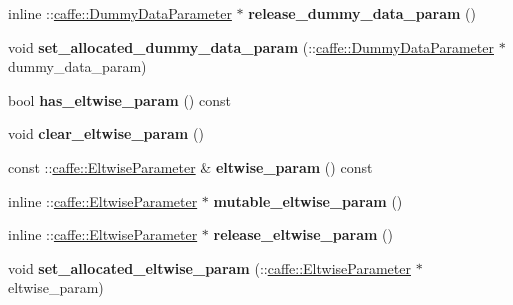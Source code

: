 \begin{DoxyCompactItemize}
inline \+::\mbox{\hyperlink{classcaffe_1_1_dummy_data_parameter}{caffe\+::\+Dummy\+Data\+Parameter}} $\ast$ {\bfseries release\+\_\+dummy\+\_\+data\+\_\+param} ()
\item 
\mbox{\label{classcaffe_1_1_v1_layer_parameter_a1463d1aa1e588be8feabd0cf71f1212c}} 
void {\bfseries set\+\_\+allocated\+\_\+dummy\+\_\+data\+\_\+param} (\+::\mbox{\hyperlink{classcaffe_1_1_dummy_data_parameter}{caffe\+::\+Dummy\+Data\+Parameter}} $\ast$dummy\+\_\+data\+\_\+param)
\item 
\mbox{\label{classcaffe_1_1_v1_layer_parameter_a5cf2168effced6bf934b951619b4e41a}} 
bool {\bfseries has\+\_\+eltwise\+\_\+param} () const
\item 
\mbox{\label{classcaffe_1_1_v1_layer_parameter_ac14bdfc8574470b615308f6526d93e64}} 
void {\bfseries clear\+\_\+eltwise\+\_\+param} ()
\item 
\mbox{\label{classcaffe_1_1_v1_layer_parameter_ae1346711b385926968253890384d7578}} 
const \+::\mbox{\hyperlink{classcaffe_1_1_eltwise_parameter}{caffe\+::\+Eltwise\+Parameter}} \& {\bfseries eltwise\+\_\+param} () const
\item 
\mbox{\label{classcaffe_1_1_v1_layer_parameter_a9e10f431a303b0c5cda37ee59fca45a6}} 
inline \+::\mbox{\hyperlink{classcaffe_1_1_eltwise_parameter}{caffe\+::\+Eltwise\+Parameter}} $\ast$ {\bfseries mutable\+\_\+eltwise\+\_\+param} ()
\item 
\mbox{\label{classcaffe_1_1_v1_layer_parameter_a5688cd87c27c83abf71cd968b2708ed7}} 
inline \+::\mbox{\hyperlink{classcaffe_1_1_eltwise_parameter}{caffe\+::\+Eltwise\+Parameter}} $\ast$ {\bfseries release\+\_\+eltwise\+\_\+param} ()
\item 
\mbox{\label{classcaffe_1_1_v1_layer_parameter_a75cb4b3841509347f124a15b7c4ed34a}} 
void {\bfseries set\+\_\+allocated\+\_\+eltwise\+\_\+param} (\+::\mbox{\hyperlink{classcaffe_1_1_eltwise_parameter}{caffe\+::\+Eltwise\+Parameter}} $\ast$eltwise\+\_\+param)
\item 

\end{DoxyCompactItemize}
